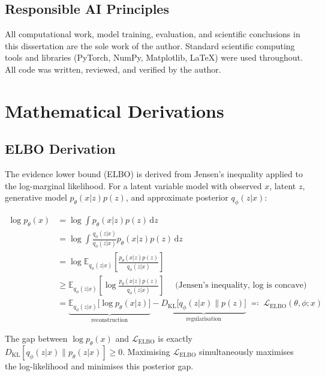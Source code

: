 \documentclass[12pt, a4paper, twoside, openright]{book}
\begin{document}
\begin{appendices}
\section{Responsible AI Principles}
\label{app:ethics:ai}

All computational work, model training, evaluation, and scientific conclusions in this dissertation are the sole work of the author. Standard scientific computing tools and libraries (PyTorch, NumPy, Matplotlib, \LaTeX) were used throughout. All code was written, reviewed, and verified by the author.

\chapter{Mathematical Derivations}
\label{app:maths}

\section{ELBO Derivation}
\label{app:maths:elbo}

The evidence lower bound (ELBO) is derived from Jensen's inequality applied to the log-marginal likelihood. For a latent variable model with observed $x$, latent $z$, generative model $p_\theta(x|z)p(z)$, and approximate posterior $q_\phi(z|x)$:

\begin{align}
\log p_\theta(x) &= \log \int p_\theta(x|z) p(z) \, \mathrm{d}z \nonumber \\
&= \log \int \frac{q_\phi(z|x)}{q_\phi(z|x)} p_\theta(x|z) p(z) \, \mathrm{d}z \nonumber \\
&= \log \mathbb{E}_{q_\phi(z|x)}\!\left[\frac{p_\theta(x|z) p(z)}{q_\phi(z|x)}\right] \nonumber \\
&\geq \mathbb{E}_{q_\phi(z|x)}\!\left[\log \frac{p_\theta(x|z) p(z)}{q_\phi(z|x)}\right]
  \quad \text{(Jensen's inequality, $\log$ is concave)} \nonumber \\
&= \underbrace{\mathbb{E}_{q_\phi(z|x)}\bigl[\log p_\theta(x|z)\bigr]}_{\text{reconstruction}} -
   \underbrace{D_{\mathrm{KL}}\bigl[q_\phi(z|x) \| p(z)\bigr]}_{\text{regularisation}}
   \;\eqqcolon\; \mathcal{L}_{\mathrm{ELBO}}(\theta, \phi; x)
\label{eq:app:elbo}
\end{align}

The gap between $\log p_\theta(x)$ and $\mathcal{L}_{\mathrm{ELBO}}$ is exactly $D_{\mathrm{KL}}[q_\phi(z|x) \| p_\theta(z|x)] \geq 0$. Maximising $\mathcal{L}_{\mathrm{ELBO}}$ simultaneously maximises the log-likelihood and minimises this posterior gap.


\end{appendices}
\end{document}
